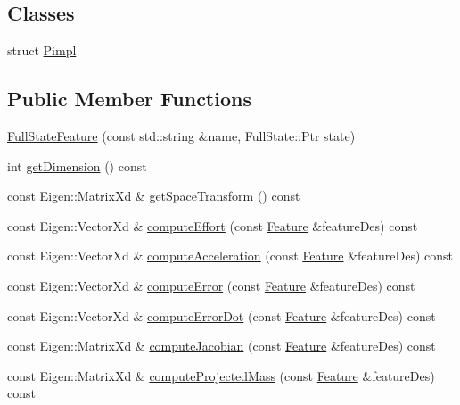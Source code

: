 \subsection*{Classes}
\begin{DoxyCompactItemize}
\item 
struct \hyperlink{structocra_1_1FullStateFeature_1_1Pimpl}{Pimpl}
\end{DoxyCompactItemize}
\subsection*{Public Member Functions}
\begin{DoxyCompactItemize}
\item 
\hyperlink{classocra_1_1FullStateFeature_a58460a5615fefc0b12b5a04767ea2386}{Full\+State\+Feature} (const std\+::string \&name, Full\+State\+::\+Ptr state)
\item 
int \hyperlink{classocra_1_1FullStateFeature_ad8fc981d605085aea19ac8fabb5dc7b7}{get\+Dimension} () const 
\item 
const Eigen\+::\+Matrix\+Xd \& \hyperlink{classocra_1_1FullStateFeature_ae3eb98614177c136299a30abc92c9546}{get\+Space\+Transform} () const 
\item 
const Eigen\+::\+Vector\+Xd \& \hyperlink{classocra_1_1FullStateFeature_a41fc20da200e9acf2fa10f4d92097de9}{compute\+Effort} (const \hyperlink{classocra_1_1Feature}{Feature} \&feature\+Des) const 
\item 
const Eigen\+::\+Vector\+Xd \& \hyperlink{classocra_1_1FullStateFeature_a4372af370af399d911461d379dfe1874}{compute\+Acceleration} (const \hyperlink{classocra_1_1Feature}{Feature} \&feature\+Des) const 
\item 
const Eigen\+::\+Vector\+Xd \& \hyperlink{classocra_1_1FullStateFeature_a51f4b711d67f8bf245a7783d3de445cf}{compute\+Error} (const \hyperlink{classocra_1_1Feature}{Feature} \&feature\+Des) const 
\item 
const Eigen\+::\+Vector\+Xd \& \hyperlink{classocra_1_1FullStateFeature_af20ad5c414321e5655ed19e6875cdaf0}{compute\+Error\+Dot} (const \hyperlink{classocra_1_1Feature}{Feature} \&feature\+Des) const 
\item 
const Eigen\+::\+Matrix\+Xd \& \hyperlink{classocra_1_1FullStateFeature_a4b52f3a619db3e48d66ff00c1ee8fa3e}{compute\+Jacobian} (const \hyperlink{classocra_1_1Feature}{Feature} \&feature\+Des) const 
\item 
const Eigen\+::\+Matrix\+Xd \& \hyperlink{classocra_1_1FullStateFeature_ad3e03b37e2d16af929b638608aaa964b}{compute\+Projected\+Mass} (const \hyperlink{classocra_1_1Feature}{Feature} \&feature\+Des) const 

\end{DoxyCompactItemize}
